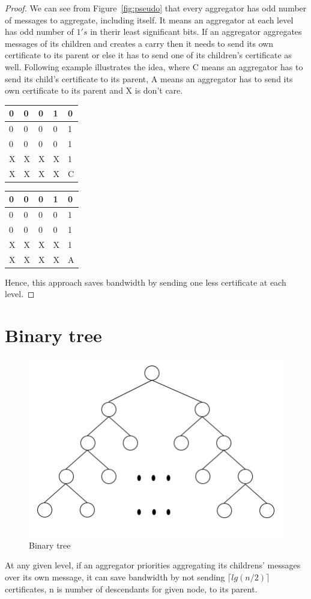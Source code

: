 	\begin{proof}
		We can see from Figure~\ref{fig:pseudo} that every aggregator has odd number of messages to aggregate, including itself.
		It means an aggregator at each level has odd number of $1's$ in therir least significant bits. 
		If an aggregator aggregates messages of its children and creates a carry then it needs to send its own certificate to its parent or else it has to send one of its children's certificate as well.
		Following example illustrates the idea, where C means an aggregator has to send its child's certificate to its parent, A means an aggregator has to send its own certificate to its parent and X is don't care.
		\begin{multicols}{2}
			\begin{tabular}{ l | l l l l }
				0 & 0 & 0 & 1 & 0 \\
				\hline
				0 & 0 & 0 & 0 & 1 \\
				0 & 0 & 0 & 0 & 1 \\
				X & X & X & X & 1 \\
				\hline
				X & X & X & X & C \\
			\end{tabular}
			\columnbreak{|}
			\begin{tabular}{ l | l l l l }
				0 & 0 & 0 & 1 & 0 \\
				\hline
				0 & 0 & 0 & 0 & 1 \\
				0 & 0 & 0 & 0 & 1 \\
				X & X & X & X & 1 \\
				\hline
				X & X & X & X & A \\
			\end{tabular}
		\end{multicols}
		
		Hence, this approach saves bandwidth by sending one less certificate at each level. 
	
	\end{proof}

\section{Binary tree}
	\begin{figure}[hp]
		\centering
		\includegraphics[scale = 0.3]{images/binary-tree}
		\caption{Binary tree}
		\label{fig:binary}
	\end{figure}

	\begin{theorem}
		At any given level, if an aggregator priorities aggregating its childrens' messages over its own message, it can save bandwidth by not sending $\lceil lg(n /2) \rceil$ certificates, n is number of descendants for given node, to its parent.
	\end{theorem}